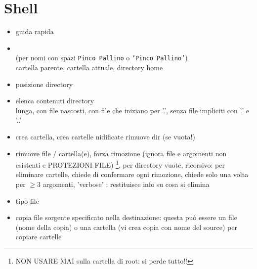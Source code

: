 \documentclass[10pt, oneside]{Book}
\begin{document}
\section{Shell}
\begin{itemize}
\item {} guida rapida

\item {}  \\(per nomi con spazi \texttt{Pinco\ Pallino} o \texttt{'Pinco Pallino'})
\\ cartella parente,  cartella attuale,  directory home

\item {} posizione directory

\item {}  elenca contenuti directory \\ lunga,   con file nascosti,   con file che iniziano per '.',   senza file impliciti con '.' e '..'

\item {} crea cartella,  crea cartelle nidificate  rimuove dir (se vuota!)

\item {} rimuove file / cartella(e),  forza rimozione (ignora file e argomenti non esistenti e PROTEZIONI FILE) \footnote{NON USARE MAI  sulla cartella di root: si perde tutto!!},  per directory vuote,   ricorsivo: per eliminare cartelle,  chiede di confermare ogni rimozione,  chiede solo una volta per $\geq3$ argomenti,  'verbose' : restituisce info su cosa si elimina

\item {} tipo file

\item {} copia file sorgente specificato nella destinazione: questa può essere un file (nome della copia) o una cartella (vi crea copia con nome del source)  per copiare cartelle


\end{itemize}
\end{document}
